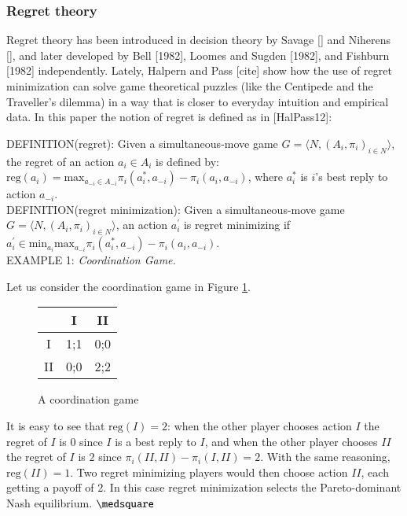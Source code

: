 \documentclass[fleqn,reqno,11pt]{article}
\begin{document}
\subsubsection{Regret theory}

Regret theory has been introduced in decision theory by Savage [] and Niherens [], and later developed by Bell [1982], Loomes and Sugden [1982], and Fishburn [1982] independently. Lately, Halpern and Pass [cite] show how the use of regret minimization can solve game theoretical puzzles (like the Centipede and the Traveller's dilemma) in a way that is closer to everyday intuition and empirical data. In this paper the notion of regret is defined as in [HalPass12]:

\vspace{.5cm}

DEFINITION(regret): Given a simultaneous-move game $ G=\langle N, (A_i , \pi_i)_{i \in N} \rangle $, the regret of an action $a_i \in A_i$ is defined by: $\text{reg}(a_i)= \text{max}_{a_{-i}\in A_{-i}} \pi_i(a_i^*,a_{-i})-\pi_i(a_i,a_{-i}) $, where $a_i^*$ is $i$'s best reply to action $a_{-i} $.\\

DEFINITION(regret minimization): Given a simultaneous-move game $ G=\langle N, (A_i , \pi_i)_{i \in N} \rangle $, an action $a^{'}_i $ is regret minimizing if $a^{'}_i \in \text{min}_{a_i} \text{max}_{a_{-i}} \pi_i(a_i^*,a_{-i})-\pi_i(a_i,a_{-i}) $.\\

EXAMPLE 1: \textit{Coordination Game.}

Let us consider the coordination game in Figure \ref{coordgame1}.

\begin{figure}
\begin{center}%
\begin{tabular}{|c|c|c|}
\hline 
 & I & II\tabularnewline
\hline 
\hline 
I & 1;1 & 0;0\tabularnewline
\hline 
II & 0;0 & 2;2\tabularnewline
\hline 
\end{tabular}\end{center}

\protect\caption{A coordination game}
\label{coordgame1}
\end{figure}

It is easy to see that $\text{reg}(I)=2$: when the other player chooses action $I$ the regret of $I$ is $0$ since $I$ is a best reply to $I$, and when the other player chooses $II$ the regret of $I$ is $2$ since $\pi_i(II,II)-\pi_i(I,II)=2$. With the same reasoning, $\text{reg}(II)=1$. Two regret minimizing players would then choose action $II$, each getting a payoff of $2$. In this case regret minimization selects the Pareto-dominant Nash equilibrium. $ \medsquare $
\end{document}
